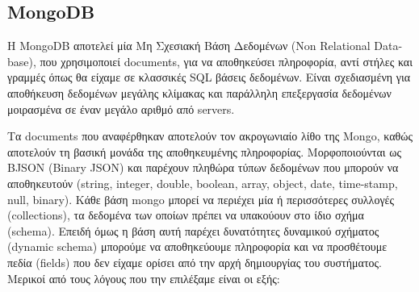 \subsection{MongoDB}
\label{subsec:mongodb}

H MongoDB αποτελεί μία Μη Σχεσιακή Βάση Δεδομένων (Non Relational Data\hyp{}base), που χρησιμοποιεί documents,
για να αποθηκεύσει πληροφορία, αντί στήλες και γραμμές όπως θα είχαμε σε κλασσικές SQL βάσεις δεδομένων.
Είναι σχεδιασμένη για αποθήκευση δεδομένων μεγάλης κλίμακας και παράλληλη επεξεργασία δεδομένων μοιρασμένα
σε έναν μεγάλο αριθμό από servers. 

Τα documents που αναφέρθηκαν αποτελούν τον ακρογωνιαίο λίθο της Mongo, καθώς αποτελούν τη βασική μονάδα
της αποθηκευμένης πληροφορίας. Μορφοποιούνται ως BJSON (Binary JSON) και παρέχουν πληθώρα τύπων δεδομένων
που μπορούν να αποθηκευτούν (string, integer, double, boolean, array, object, date, time\hyp{}stamp, null, binary). Κάθε βάση mongo μπορεί να περιέχει μία ή περισσότερες συλλογές (collections),
τα δεδομένα των οποίων πρέπει να υπακούουν στο ίδιο σχήμα (schema). Επειδή όμως η βάση αυτή παρέχει
δυνατότητες δυναμικού σχήματος (dynamic schema) μπορούμε να αποθηκεύουμε πληροφορία και να προσθέτουμε πεδία (fields)
που δεν είχαμε ορίσει από την αρχή δημιουργίας του συστήματος. \\

Μερικοί από τους λόγους που την επιλέξαμε είναι οι εξής:

